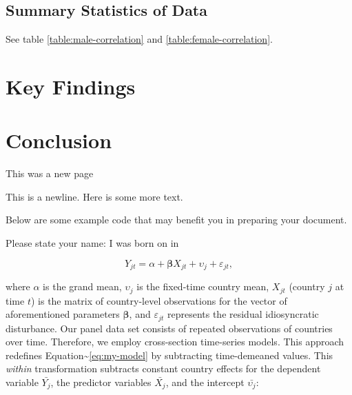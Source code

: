 \documentclass[]{article}
\begin{document}
\subsection{Summary Statistics of Data}
\label{sec:data-summary}

See table \ref{table:male-correlation} and
\ref{table:female-correlation}.



\newpage



\newpage

\section{Key Findings}
\label{sec:findings}

\section{Conclusion}
\label{sec:conclusion}

\newpage

This was a new page

This is a newline. \newline  Here is some more text.

Below are some example code that may benefit you in preparing your
document. \newline

\vspace{0.25in}

\noindent Please state your name: \hrulefill \newline I was born on
\hrulefill in \hrulefill \vspace{0.25in}

\begin{equation}
\label{eq:my-model}
    Y_{jt} = \alpha + \bm{\beta}X_{jt} + \upsilon_{j}  + \varepsilon_{jt} ,
\end{equation}

\noindent where \(\alpha\) is the grand mean, \(\upsilon_{j}\) is the
fixed-time country mean, \(X_{jt}\) (country \(j\) at time \(t\)) is the
matrix of country-level observations for the vector of aforementioned
parameters \(\bm{\beta}\), and \(\varepsilon_{jt}\) represents the
residual idiosyncratic disturbance. Our panel data set consists of
repeated observations of countries over time. Therefore, we employ
cross-section time-series models. This approach redefines
Equation\textasciitilde{}\ref{eq:my-model} by subtracting time-demeaned
values. This \emph{within} transformation subtracts constant country
effects for the dependent variable \(\bar{Y_{j}}\), the predictor
variables \(\bar{X_{j}}\), and the intercept \(\bar{\upsilon_{j}}\):
\end{document}
